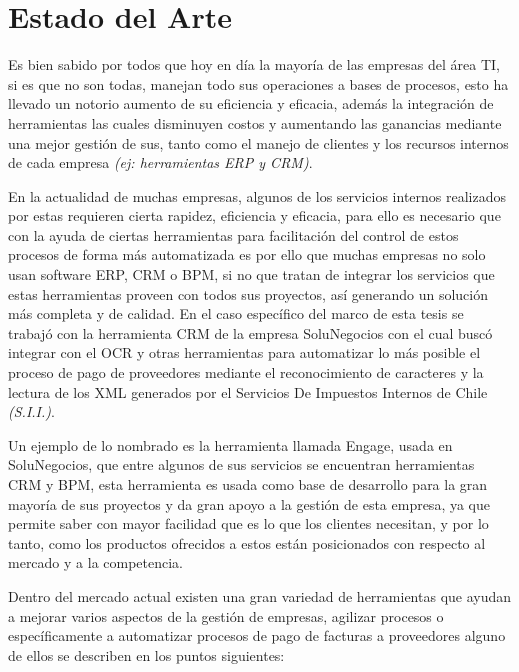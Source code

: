 \chapter{Estado del Arte}
\newpage
    Es bien sabido por todos que hoy en día la mayoría de las empresas del área TI, si es que no son todas, manejan
    todo sus operaciones a bases de procesos, esto ha llevado un notorio aumento de su eficiencia y eficacia, además la integración de herramientas las cuales disminuyen costos y aumentando las ganancias mediante una mejor gestión de sus, tanto como el manejo de clientes y los recursos internos de cada empresa \emph{(ej: herramientas ERP y CRM)}.
    \newline
    \par
    En la actualidad de muchas empresas, algunos de los servicios internos realizados por estas requieren cierta rapidez, eficiencia y eficacia, para ello es necesario que con la ayuda de ciertas herramientas para facilitación del control de estos procesos de forma más automatizada es por ello que muchas empresas no solo usan software ERP, CRM o BPM, si no que tratan de integrar los servicios que estas herramientas proveen con todos sus proyectos, así generando un solución más completa y de calidad. En el caso específico del marco de esta tesis se trabajó con la herramienta CRM de la empresa SoluNegocios con el cual buscó integrar con el OCR y otras herramientas para automatizar lo más posible el proceso de pago de proveedores mediante el reconocimiento de caracteres y la lectura de los XML generados por el Servicios De Impuestos Internos de Chile \textit{(S.I.I.)}.
    \newline
    \par
    Un ejemplo de lo nombrado es la herramienta llamada Engage, usada en SoluNegocios, que entre algunos de sus servicios se encuentran herramientas CRM y BPM, esta herramienta es usada como base de desarrollo para la gran mayoría de sus proyectos y da gran apoyo a la gestión de esta empresa, ya que permite saber con mayor facilidad que es lo que los clientes necesitan, y por lo tanto, como los productos ofrecidos a estos están posicionados con respecto al mercado y a la competencia.    
    \newline
    \par
    Dentro del mercado actual existen una gran variedad de herramientas que ayudan a mejorar varios aspectos de la gestión de empresas, agilizar procesos o específicamente a automatizar procesos de pago de facturas a proveedores alguno de ellos se describen en los puntos siguientes:
    
